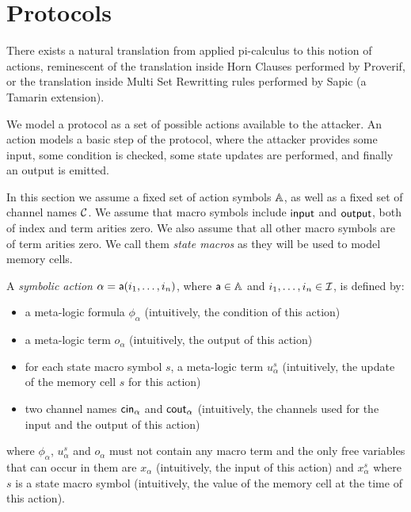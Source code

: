 \section{Protocols}


There exists a natural translation from applied pi-calculus to this notion of
actions, reminescent of the translation inside Horn Clauses performed by
Proverif, or the translation inside Multi Set Rewritting rules performed by
Sapic (a Tamarin extension).

\bigskip

We  model a protocol as a set of possible actions available to the
attacker. An action models a basic step of the protocol, where
the attacker provides some input, some condition is checked, some
state updates are performed, and finally an output is emitted.

In this section we assume a fixed set of action symbols $\mathbb{A}$,
as well as a fixed set of channel names $\mathcal{C}$.
We assume that macro symbols include $\textsf{input}$ and $\textsf{output}$,
both of index and term arities zero.
We also assume that all other macro symbols are of term arities zero.
We call them \emph{state macros} as they will be used to model memory cells.

\begin{definition}
  \label{def:action}
A \emph{symbolic action} $\alpha = \textsf{a}(i_1,\dots,i_n)$, where $\textsf{a} \in \mathbb{A}$ and $i_1,\dots,i_n \in \mathcal{I}$, is defined by:
\begin{itemize}
  \item a meta-logic formula $\phi_{\alpha}$ (intuitively, the condition of this action)
  \item a meta-logic term $o_{\alpha}$ (intuitively, the output of this action)
  \item for each state macro symbol $s$, a meta-logic term $u_{\alpha}^{s}$ (intuitively, the update of the memory cell $s$ for this action)
  \item two channel names $\mathsf{cin}_\alpha$ and $\mathsf{cout}_\alpha$ (intuitively, the channels used for the input and the output of this action)
\end{itemize}
where $\phi_{\alpha}$, $u_{\alpha}^{s}$ and $o_{\alpha}$ must not contain any
macro term and the only free variables that can occur in them are
$x_\alpha$ (intuitively, the input of this action)
and $x^s_\alpha$ where $s$ is a state macro symbol (intuitively, the value
of the memory cell at the time of this action).
\end{definition}

